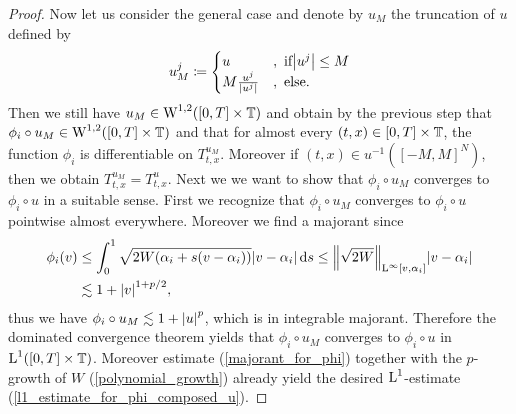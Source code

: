 \begin{proof}
	Now let us consider the general case and denote by $ u_{ M } $ the truncation of $ u $ defined by
	\begin{equation*}
		u_{ M }^{ j } 
		\coloneqq
		\begin{cases}
			u &, \text{ if} \abs{ u^{ j } } \leq M 
			\\
			M \frac{ u^{ j } }{ \abs{ u^{ j } } }
			&, \text{ else}.
		\end{cases}
	\end{equation*}
	Then we still have $ u_{ M } \in \operatorname{W}^{ 1, 2 } ( [ 0 , T ] \times \operatorname{\mathbb{T}} ) $ and obtain by the previous step that $ \phi_{ i } \circ u_{ M } \in \operatorname{W}^{ 1, 2 } ( [ 0 , T ] \times \operatorname{\mathbb{T}} ) $ and that for almost every $ ( t, x ) \in [ 0 , T ] \times \operatorname{\mathbb{T}} $, the function $ \phi_{ i } $ is differentiable on $ T_{ t, x }^{ u_{ M } } $. Moreover if $ ( t, x ) \in u^{ - 1 } ( [ - M , M ]^{ N } ) $, then we obtain $ T_{ t, x }^{ u_{ M } } = T_{ t, x }^{ u } $.
	Next we we want to show that $ \phi_{ i } \circ u_{ M } $ converges to $ \phi_{ i } \circ u $ in a suitable sense. First we recognize that $ \phi_{ i } \circ u_{ M } $ converges to $ \phi_{ i } \circ u $ pointwise almost everywhere. Moreover we find a majorant since
	\begin{align}
		\notag
		\phi_{ i } ( v ) 
		&
		\leq
		\int_{ 0 }^{ 1 }
			\sqrt{ 2 W ( \alpha_{ i } + s ( v - \alpha_{ i } ) ) }
			\abs{ v - \alpha_{i } }
		\dd{ s }
		\leq
		\norm{ \sqrt{ 2 W } }_{ \operatorname{L}^{ \infty } [ v, \alpha_{ i } ] }
		\abs{ v - \alpha_{ i } }
		\\
		\label{majorant_for_phi}
		& \lesssim
		1 + \abs{ v }^{ 1 + p/2 },
	\end{align}
	thus we have $ \phi_{ i } \circ u_{ M } \lesssim 1 + \abs{ u }^{ p } $, which is in integrable majorant. Therefore the dominated convergence theorem yields that $ \phi_{ i } \circ u_{ M } $ converges to $ \phi_{ i } \circ u $ in $ \operatorname{L}^{ 1 } ( [ 0 , T ] \times \operatorname{\mathbb{T}} ) $.
	Moreover estimate (\ref{majorant_for_phi}) together with the $ p $-growth of $ W $ (\ref{polynomial_growth}) already yield the desired $ \operatorname{L}^{ 1 } $-estimate (\ref{l1_estimate_for_phi_composed_u}).
	

\end{proof}
